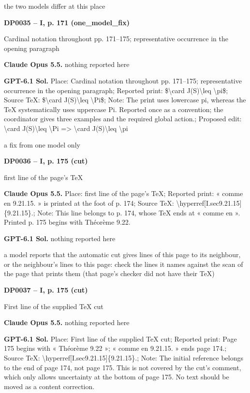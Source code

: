 the two models differ at this place\par
\par\noindent\hypertarget{DP0035}{}\textbf{DP0035 -- I, p. 171 (one\_model\_fix)}\par
Cardinal notation throughout pp. 171–175; representative occurrence in the opening paragraph\par
\textbf{Claude Opus 5.5.} nothing reported here\par
\textbf{GPT-6.1 Sol.} Place: Cardinal notation throughout pp. 171–175; representative occurrence in the opening paragraph; Reported print: \$\textbackslash{}card J(S)\textbackslash{}leq \textbackslash{}pi\$; Source TeX: \$\textbackslash{}card J(S)\textbackslash{}leq \textbackslash{}Pi\$; Note: The print uses lowercase pi, whereas the TeX systematically uses uppercase Pi. Reported once as a convention; the coordinator gives three examples and the required global action.; Proposed edit: \textbackslash{}card J(S)\textbackslash{}leq \textbackslash{}Pi =\allowbreak > \textbackslash{}card J(S)\textbackslash{}leq \textbackslash{}pi\par
a fix from one model only\par
\par\noindent\hypertarget{DP0036}{}\textbf{DP0036 -- I, p. 175 (cut)}\par
first line of the page's TeX\par
\textbf{Claude Opus 5.5.} Place: first line of the page's TeX; Reported print: « comme en 9.21.15. » is printed at the foot of p. 174; Source TeX: \textbackslash{}hyperref[I.sec9.21.15]\{9.21.15\}.; Note: This line belongs to p. 174, whose TeX ends at « comme en ». Printed p. 175 begins with Théorème 9.22.\par
\textbf{GPT-6.1 Sol.} nothing reported here\par
a model reports that the automatic cut gives lines of this page to its neighbour, or the neighbour's lines to this page: check the lines it names against the scan of the page that prints them (that page's checker did not have their TeX)\par
\par\noindent\hypertarget{DP0037}{}\textbf{DP0037 -- I, p. 175 (cut)}\par
First line of the supplied TeX cut\par
\textbf{Claude Opus 5.5.} nothing reported here\par
\textbf{GPT-6.1 Sol.} Place: First line of the supplied TeX cut; Reported print: Page 175 begins with « Théorème 9.22 »; « comme en 9.21.15. » ends page 174.; Source TeX: \textbackslash{}hyperref[I.sec9.21.15]\{9.21.15\}.; Note: The initial reference belongs to the end of page 174, not page 175. This is not covered by the cut's comment, which only allows uncertainty at the bottom of page 175. No text should be moved as a content correction.\par
